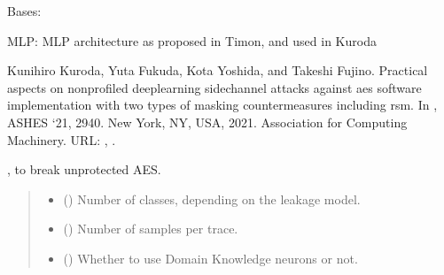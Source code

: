 \documentclass[letterpaper,10pt,english]{sphinxmanual}
\begin{document}
\begin{fulllineitems}
\label{\detokenize{MLSCAlib.Architectures:MLSCAlib.Architectures.torch_models.MLP}}
\pysigstartsignatures
{}
\pysigstopsignatures
\sphinxAtStartPar
Bases: 

\sphinxAtStartPar
MLP: MLP architecture as proposed in Timon\sphinxfootnotemark[3], and used in Kuroda %
\begin{footnote}[6]\sphinxAtStartFootnote
Kunihiro Kuroda, Yuta Fukuda, Kota Yoshida, and Takeshi Fujino. Practical aspects on non\sphinxhyphen{}profiled deep\sphinxhyphen{}learning side\sphinxhyphen{}channel attacks against aes software implementation with two types of masking countermeasures including rsm. In , ASHES ‘21, 29\textendash{}40. New York, NY, USA, 2021. Association for Computing Machinery. URL: , .
%
\end{footnote}, to break unprotected AES.
\begin{quote}\begin{description}
\begin{itemize}
\item {} 
\sphinxAtStartPar
{} () \textendash{} Number of classes, depending on the leakage model.

\item {} 
\sphinxAtStartPar
{} () \textendash{} Number of samples per trace.

\item {} 
\sphinxAtStartPar
{} (\sphinxstyleliteralemphasis{\sphinxupquote{, }}) \textendash{} Whether to use Domain Knowledge neurons or not.


\end{itemize}
\end{description}
\end{quote}
\end{fulllineitems}
\end{document}
